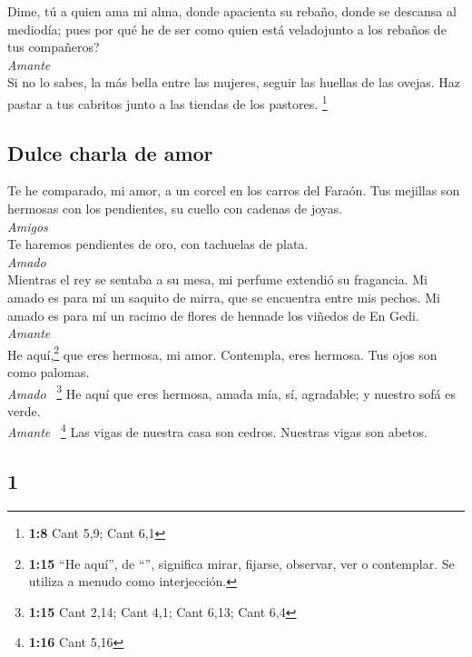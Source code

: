 \begin{paracol}{2}
 Dime, tú a quien ama mi alma, donde apacienta su rebaño,
donde se descansa al mediodía; pues por qué he de ser como quien está
veladojunto a los rebaños de tus compañeros?\\
\emph{Amante}\\
 Si no lo sabes, la más bella entre las mujeres, seguir
las huellas de las ovejas. Haz pastar a tus cabritos junto a las tiendas
de los pastores. \footnote{\textbf{1:8} Cant 5,9; Cant 6,1}

\hypertarget{dulce-charla-de-amor}{%
\subsection{Dulce charla de amor}\label{dulce-charla-de-amor}}

 Te he comparado, mi amor, a un corcel en los carros del
Faraón.  Tus mejillas son hermosas con los pendientes, su
cuello con cadenas de joyas.\\
\emph{Amigos}\\
 Te haremos pendientes de oro, con tachuelas de plata.\\
\emph{Amado}\\
 Mientras el rey se sentaba a su mesa, mi perfume
extendió su fragancia.  Mi amado es para mí un saquito de
mirra, que se encuentra entre mis pechos.  Mi amado es
para mí un racimo de flores de hennade los viñedos de En Gedi.\\
\emph{Amante}\\
 He aquí,\footnote{\textbf{1:15} ``He aquí'', de
  ``'', significa mirar, fijarse, observar, ver o
  contemplar. Se utiliza a menudo como interjección.} que eres hermosa,
mi amor. Contempla, eres hermosa. Tus ojos son como palomas.\\
\emph{Amado} ~\footnote{\textbf{1:15} Cant 2,14; Cant 4,1; Cant 6,13;
  Cant 6,4}  He aquí que eres hermosa, amada mía, sí,
agradable; y nuestro sofá es verde.\\
\emph{Amante} ~\footnote{\textbf{1:16} Cant 5,16}  Las
vigas de nuestra casa son cedros. Nuestras vigas son abetos.

\switchcolumn
\begin{otherlanguage}{english}

\hypertarget{section-1}{%
\section{1}\label{section-1}}


\end{otherlanguage}
\end{paracol}
